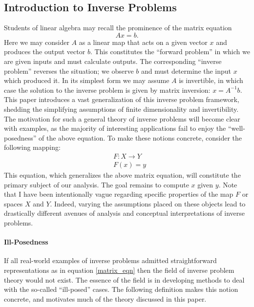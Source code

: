 \documentclass[12pt]{article}
\begin{document}
\subsection*{Introduction to Inverse Problems} 
Students of linear algebra may recall the prominence of the matrix equation
\begin{equation} 
Ax = b. \label{matrix_eqn}
\end{equation}  
Here we may consider $A$ as a linear map 
that acts on a given vector $x$ and produces the output vector $b$. 
This constitutes the ``forward problem'' in which we are given inputs and must 
calculate outputs. The corresponding ``inverse problem'' reverses the situation; we observe 
$b$ and must determine the input $x$ which produced it. In its simplest form we may assume 
$A$ is invertible, in which case the solution to the inverse problem is given by matrix 
inversion: $x = A^{-1}b$. This paper introduces a vast generalization of this inverse 
problem framework, shedding the simplifying assumptions of finite dimensionality
and invertibility. The motivation for such a general theory 
of inverse problems will become clear with examples, as the majority of interesting 
applications fail to enjoy the ``well-posedness'' of the above equation. 
To make these notions concrete, consider the following mapping:
\begin{eqnarray} 
&F: X \to Y \\
&F(x) = y \label{inverse_problem}
\end{eqnarray} 
This equation, which generalizes the above matrix equation, will constitute the primary subject 
of our analysis. The goal remains to compute $x$ given $y$. Note that I have been intentionally 
vague regarding specific properties of the map $F$ or spaces $X$ and $Y$. Indeed, varying the assumptions 
placed on these objects lead to drastically different avenues of analysis and conceptual interpretations
of inverse problems. 

\paragraph*{Ill-Posedness}

If all real-world examples of inverse problems admitted straightforward representations as in equation \ref{matrix_eqn}
then the field of inverse problem theory would not exist. The essence of the field is in developing methods to 
deal with the so-called ``ill-posed'' cases. The following definition makes this notion concrete, 
and motivates much of the theory discussed in this paper. 
\end{document}
